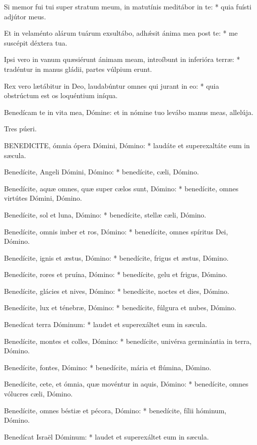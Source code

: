 Si memor fui tui super stratum meum, in matutínis meditábor in te: * quia fuísti adjútor meus.

Et in velaménto alárum tuárum exsultábo, adhǽsit ánima mea post te: * me suscépit déxtera tua.

Ipsi vero in vanum quæsiérunt ánimam meam, introíbunt in inferióra terræ: * tradéntur in manus gládii, partes vúlpium erunt.

Rex vero lætábitur in Deo, laudabúntur omnes qui jurant in eo: * quia obstrúctum est os loquéntium iníqua.

 Benedícam te in vita mea, Dómine: et in nómine tuo levábo manus meas, allelúja.

 Tres púeri.


\lettrine[lines=2]{B}{ENEDICITE}, ómnia ópera Dómini, Dómino: * laudáte et superexaltáte eum in sæcula.

Benedícite, Angeli Dómini, Dómino: * benedícite, cæli, Dómino.

Benedícite, aquæ omnes, quæ super cælos sunt, Dómino: * benedícite, omnes virtútes Dómini, Dómino.

Benedícite, sol et luna, Dómino: * benedícite, stellæ cæli, Dómino.

Benedícite, omnis imber et ros, Dómino: * benedícite, omnes spíritus Dei, Dómino.

Benedícite, ignis et æstus, Dómino: * benedícite, frigus et æstus, Dómino.

Benedícite, rores et pruína, Dómino: * benedícite, gelu et frigus, Dómino.

Benedícite, glácies et nives, Dómino: * benedícite, noctes et dies, Dómino.

Benedícite, lux et ténebræ, Dómino: * benedícite, fúlgura et nubes, Dómino.

Benedícat terra Dóminum: * laudet et superexáltet eum in sæcula.

Benedícite, montes et colles, Dómino: * benedícite, univérsa germinántia in terra, Dómino.

Benedícite, fontes, Dómino: * benedícite, mária et flúmina, Dómino.

Benedícite, cete, et ómnia, quæ movéntur in aquis, Dómino: * benedícite, omnes vólucres cæli, Dómino.

Benedícite, omnes béstiæ et pécora, Dómino: * benedícite, fílii hóminum, Dómino.

Benedícat Israël Dóminum: * laudet et superexáltet eum in sæcula.

